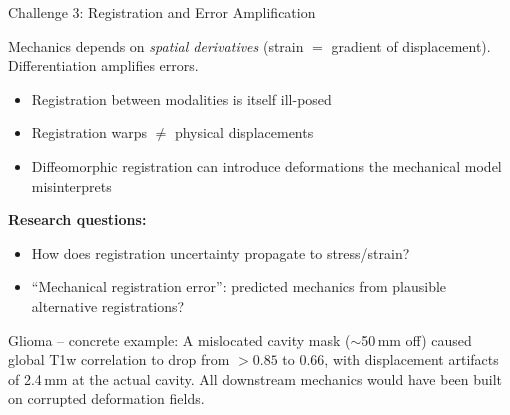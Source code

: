 \begin{frame}{Challenge 3: Registration and Error Amplification}

  Mechanics depends on \emph{spatial derivatives} (strain $=$
  gradient of displacement). Differentiation amplifies errors.

  \bigskip

  \begin{itemize}
    \item Registration between modalities is itself ill-posed
    \item Registration warps $\neq$ physical displacements
    \item Diffeomorphic registration can introduce deformations the
      mechanical model misinterprets
  \end{itemize}

  \bigskip

  \textbf{Research questions:}
  \begin{itemize}
    \item How does registration uncertainty propagate to stress/strain?
    \item ``Mechanical registration error'': predicted mechanics from
      plausible alternative registrations?
  \end{itemize}

  \medskip

  \alert{Glioma -- concrete example:} A mislocated cavity mask
  ($\sim$50\,mm off) caused global T1w correlation to drop from
  $> 0.85$ to 0.66, with displacement artifacts of 2.4\,mm at the
  actual cavity.  All downstream mechanics would have been built on
  corrupted deformation fields.

\end{frame}


